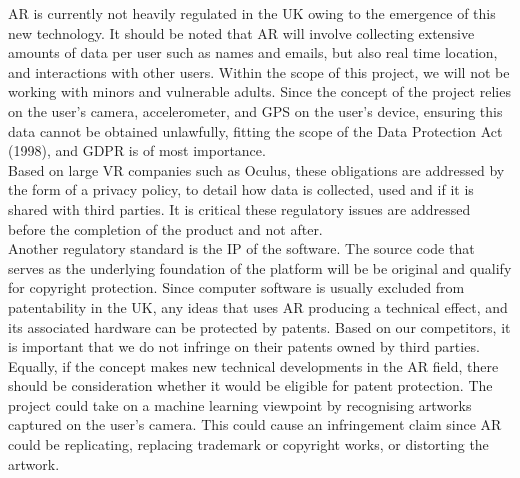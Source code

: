 
AR is currently not heavily regulated in the UK owing to the emergence of this new technology. It should be noted that AR will involve collecting extensive amounts of data per user such as names and emails, but also real time location, and interactions with other users. Within the scope of this project, we will not be working with minors and vulnerable adults. Since the concept of the project relies on the user's camera, accelerometer, and GPS on the user's device, ensuring this data cannot be obtained unlawfully, fitting the scope of the Data Protection Act (1998), and GDPR is of most importance.\cite{ITProPortal}\\

Based on large VR companies such as Oculus, these obligations are addressed by the form of a privacy policy, to detail how data is collected, used and if it is shared with third parties. It is critical these regulatory issues are addressed before the completion of the product and not after.\\

Another regulatory standard is the IP of the software. The source code that serves as the underlying foundation of the platform will be be original and qualify for copyright protection. Since computer software is usually excluded from patentability in the UK, any ideas that uses AR producing a technical effect, and its associated hardware can be protected by patents. Based on our competitors, it is important that we do not infringe on their patents owned by third parties.\\

Equally, if the concept makes new technical developments in the AR field, there should be consideration whether it would be eligible for patent protection. The project could take on a machine learning viewpoint by recognising artworks captured on the user's camera. This could cause an infringement claim since AR could be replicating, replacing trademark or copyright works, or distorting the artwork.